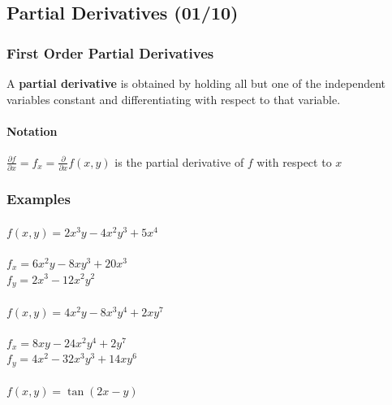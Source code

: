 \documentclass[
  letterpaper,
  DIV=11,
  numbers=noendperiod]{scrartcl}
\let\oldparagraph\paragraph
\renewcommand{\paragraph}[1]{\oldparagraph{#1}\mbox{}}
\begin{document}
\subsection{Partial Derivatives (01/10)}\label{partial-derivatives-0110}

\subsubsection{First Order Partial
Derivatives}\label{first-order-partial-derivatives}

A \textbf{partial derivative} is obtained by holding all but one of the
independent variables constant and differentiating with respect to that
variable.

\paragraph{Notation}\label{notation}

\(\frac{\partial f}{\partial x} = f_x = \frac{\partial}{\partial x}f(x, y)\)
is the partial derivative of \(f\) with respect to \(x\)

\subsubsection{Examples}\label{examples-4}

\paragraph{\texorpdfstring{\(f(x, y) = 2x^3y-4x^2y^3+5x^4\)}{f(x, y) = 2x\^{}3y-4x\^{}2y\^{}3+5x\^{}4}}\label{fx-y-2x3y-4x2y35x4}

\(f_x = 6x^2y-8xy^3+20x^3\)\\
\(f_y = 2x^3-12x^2y^2\)

\paragraph{\texorpdfstring{\(f(x, y) = 4x^2y-8x^3y^4+2xy^7\)}{f(x, y) = 4x\^{}2y-8x\^{}3y\^{}4+2xy\^{}7}}\label{fx-y-4x2y-8x3y42xy7}

\(f_x = 8xy-24x^2y^4+2y^7\)\\
\(f_y = 4x^2-32x^3y^3+14xy^6\)

\paragraph{\texorpdfstring{\(f(x,y)=\tan(2x-y)\)}{f(x,y)=\textbackslash tan(2x-y)}}\label{fxytan2x-y}
\end{document}
